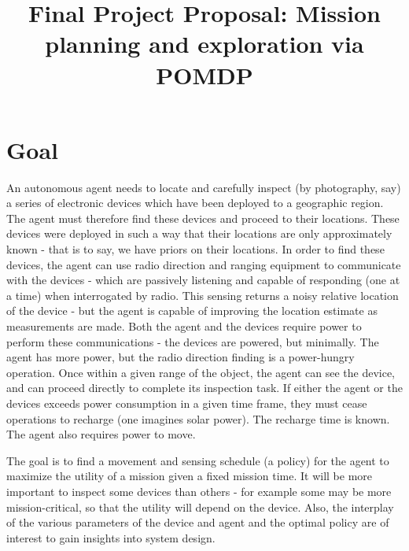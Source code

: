 \documentclass[twoside,11pt]{article}
\begin{document}
\title{Final Project Proposal: Mission planning and exploration via POMDP}


\maketitle

\section{Goal}
An autonomous agent needs to locate and carefully inspect (by photography, say) a series of electronic devices which have been deployed to a geographic region.  The agent must therefore find these devices and proceed to their locations. These devices were deployed in such a way that their locations are only approximately known - that is to say, we have priors on their locations. In order to find these devices, the agent can use radio direction and ranging equipment to communicate with the devices - which are passively listening and capable of responding (one at a time) when interrogated by radio. This sensing returns a noisy relative location of the device - but the agent is capable of improving the location estimate as measurements are made. Both the agent and the devices require power to perform these communications - the devices are powered, but minimally. The agent has more power, but the radio direction finding is a power-hungry operation. Once within a given range of the object, the agent can see the device, and can proceed directly to complete its inspection task. If either the agent or the devices exceeds power consumption in a given time frame, they must cease operations to recharge (one imagines solar power). The recharge time is known. The agent also requires power to move.

The goal is to find a movement and sensing schedule (a policy) for the agent to maximize the utility of a mission given a fixed mission time. It will be more important to inspect some devices than others - for example some may be more mission-critical, so that the utility will depend on the device. Also, the interplay of the various parameters of the device and agent and the optimal policy are of interest to gain insights into system design.
\end{document}
